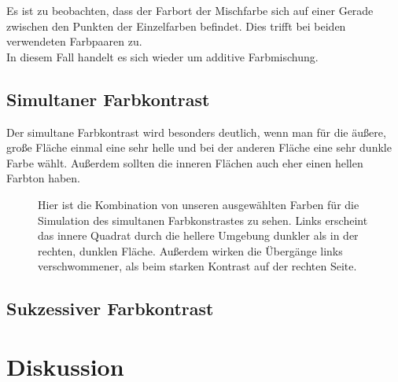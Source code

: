 \documentclass[11pt]{article}
\begin{document}
Es ist zu beobachten, dass der Farbort der Mischfarbe sich auf einer Gerade zwischen den Punkten der Einzelfarben befindet. Dies trifft bei beiden verwendeten Farbpaaren zu. \\

In diesem Fall handelt es sich wieder um additive Farbmischung. 

\subsection{Simultaner Farbkontrast}
Der simultane Farbkontrast wird besonders deutlich, wenn man für die äußere, große Fläche einmal eine sehr helle und bei der anderen Fläche eine sehr dunkle Farbe wählt. Außerdem sollten die inneren Flächen auch eher einen hellen Farbton haben. 

\begin{figure}[H]
\caption{Hier ist die Kombination von unseren ausgewählten Farben für die Simulation des simultanen Farbkonstrastes zu sehen. Links erscheint das innere Quadrat durch die hellere Umgebung dunkler als in der rechten, dunklen Fläche. Außerdem wirken die Übergänge links verschwommener, als beim starken Kontrast auf der rechten Seite.}
\label{meta2}
\end{figure}

\subsection{Sukzessiver Farbkontrast}

\section{Diskussion}
\end{document}
